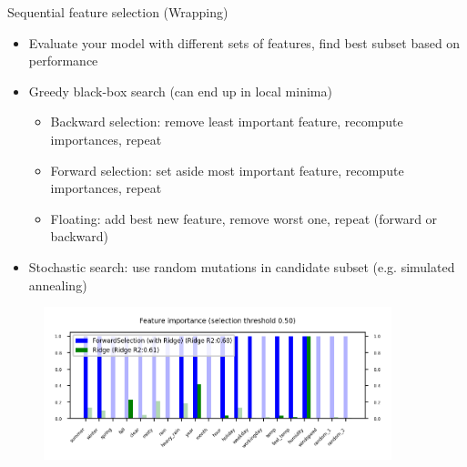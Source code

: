 \begin{frame}[allowframebreaks]{Sequential feature selection (Wrapping)}
\begin{itemize}
    \item Evaluate your model with different sets of features, find best subset based on performance
    \item Greedy black-box search (can end up in local minima)
    \begin{itemize}
        \item Backward selection: remove least important feature, recompute importances, repeat
        \item Forward selection: set aside most important feature, recompute importances, repeat
        \item Floating: add best new feature, remove worst one, repeat (forward or backward)
    \end{itemize}
    \item Stochastic search: use random mutations in candidate subset (e.g. simulated annealing)
\end{itemize}

\begin{figure}
    \centering
    \includegraphics[width=0.9\textwidth]{images/pre-processing/sequential.png}
\end{figure}
\end{frame}

